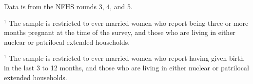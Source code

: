 \documentclass[12pt]{article}
\begin{document}
\begin{table}[H]
    \centering
    \begin{threeparttable}[t]
        \caption{:  None of the improvement in the outcomes is explained by changing composition in household structures}
        \label{tab:decomposition}

        \scriptsize
        \setlength{\tabcolsep}{10pt}
        \renewcommand{\arraystretch}{2.5}

        

        \begin{tablenotes}
            \item Data is from the NFHS rounds 3, 4, and 5. 
            \item $^1$ The sample is restricted to ever-married women who report being three or more months pregnant at the time of the survey, and those who are living in either nuclear or patrilocal extended households. 

            \item $^1$ The sample is restricted to ever-married women who report having given birth in the last 3 to 12 months, and those who are living in either nuclear or patrilocal extended households. 

            
        \end{tablenotes}
    \end{threeparttable}
\end{table}


    





\end{document}
